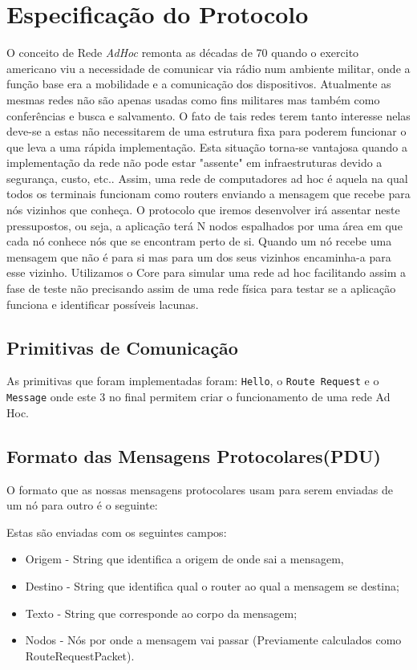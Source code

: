 \documentclass{llncs}
\begin{document}
\section{Especificação do Protocolo}
O conceito de Rede \textit{AdHoc} remonta as décadas de 70 quando o exercito americano viu a necessidade de comunicar via rádio num ambiente militar, onde a função base era a mobilidade e a comunicação dos dispositivos.
	Atualmente as mesmas redes não são apenas usadas como fins militares mas também como conferências e busca e salvamento.
	O fato de tais redes terem tanto interesse nelas deve-se a estas não necessitarem de uma estrutura fixa para poderem funcionar o que leva a uma rápida implementação.
	Esta situação torna-se vantajosa quando a implementação da rede não pode estar "assente" em infraestruturas devido a segurança, custo, etc..
	Assim, uma rede de computadores ad hoc é aquela na qual todos os terminais funcionam como routers enviando a mensagem que recebe para nós vizinhos que conheça.
	O protocolo que iremos desenvolver irá assentar neste pressupostos, ou seja, a aplicação terá N nodos espalhados por uma área em que cada nó conhece nós que se encontram perto de si.
	Quando um nó recebe uma mensagem que não é para si mas para um dos seus vizinhos encaminha-a para esse vizinho.
	Utilizamos o Core para simular uma rede ad hoc facilitando assim a fase de teste não precisando assim de uma rede física para testar se a aplicação funciona e identificar possíveis lacunas.


\subsection{Primitivas de Comunicação}
As primitivas que foram implementadas foram: \texttt{Hello}, o \texttt{Route Request} e o \texttt{Message} onde este 3 no final permitem criar o funcionamento de uma rede Ad Hoc.


\subsection{Formato das Mensagens Protocolares(PDU)}
O formato que as nossas mensagens protocolares usam para serem enviadas de um nó para outro é o seguinte:

Estas são enviadas com os seguintes campos:
\begin{itemize}
\item Origem - String que identifica a origem de onde sai a mensagem,
\item Destino - String que identifica qual o router ao qual a mensagem se destina;
\item Texto - String que corresponde ao corpo da mensagem;
\item Nodos - Nós por onde a mensagem vai passar (Previamente calculados como RouteRequestPacket).
\end{itemize}
\end{document}
